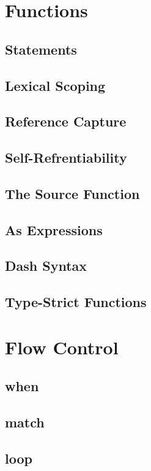 \documentclass[12pt,letterpaper]{report}
\begin{document}



\chapter{Functions}\label{Functions}
\section{Statements}\label{Statements}
\section{Lexical Scoping}\label{Lexical Scoping}
\section{Reference Capture}\label{Reference Capture}
\section{Self-Refrentiability}\label{Self-Refrentiability}
\section{The Source Function}\label{The Source Function}
\section{As Expressions}\label{As Expressions}
\section{Dash Syntax}\label{Dash Syntax}
\section{Type-Strict Functions}\label{Type-Strict Functions}
\chapter{Flow Control}\label{Flow Control}
\section{when}\label{when}
\section{match}\label{match}
\section{loop}\label{loop}
\end{document}

